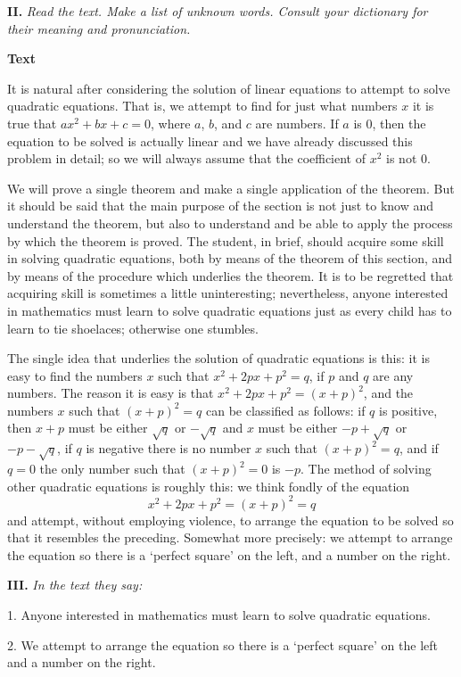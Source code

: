 \documentclass[a4paper]{article}
\newcommand{\ESect}[1]{\medskip\par{\large \textbf{#1}}\par}
\newcommand{\ETask}[2]{\medskip\par\textbf{#1.} \textit{#2}\par}
\begin{document}
\ETask{II}{Read the text. Make a list of unknown words. Consult your dictionary for their meaning and pronunciation.}

\ESect{Text}
It is natural after considering the solution of linear equations to attempt to solve quadratic equations. That is, we attempt to
find for just what numbers $x$ it is true that $ax^2+bx+c=0$, where $a$, $b$, and $c$ are numbers. If $a$ is 0, then the equation
to be solved is actually linear and we have already discussed this problem in detail; so we will always assume that the
coefficient of $x^2$ is not 0.

We will prove a single theorem and make a single application of the theorem. But it should be said that the main purpose of the
section is not just to know and understand the theorem, but also to understand and be able to apply the process by which the
theorem is proved. The student, in brief, should acquire some skill in solving quadratic equations, both by means of the theorem
of this section, and by means of the procedure which underlies the theorem. It is to be regretted that acquiring skill is
sometimes a little uninteresting; nevertheless, anyone interested in mathematics must learn to solve quadratic equations just
as every child has to learn to tie shoelaces; otherwise one stumbles.

The single idea that underlies the solution of quadratic equations is this: it is easy to find the numbers $x$ such that
$x^2+2px+p^2=q$, if $p$ and $q$ are any numbers. The reason it is easy is that $x^2+2px+p^2=(x+p)^2$, and the numbers $x$ such
that $(x+p)^2=q$ can be classified as follows: if $q$ is positive, then $x + p$ must be either $\sqrt{q}$ or $-\sqrt{q}$ and
$x$ must be either $-p+\sqrt{q}$ or $-p-\sqrt{q}$, if $q$ is negative there is no number $x$ such that $(x+p)^2=q$, and
if $q = 0$ the only number such that $(x+p)^2=0$ is $-p$. The method of solving other quadratic equations is roughly this:
we think fondly of the equation
$$x^2+2px+p^2=(x+p)^2=q$$
and attempt, without employing violence, to arrange the equation to be solved so that it resembles the preceding. Somewhat
more precisely: we attempt to arrange the equation so there is a `perfect square' on the left, and a number on the right.

\ETask{III}{In the text they say:}
1. Anyone interested in mathematics must learn to solve quadratic equations.

2. We attempt to arrange the equation so there is a `perfect square' on the left and a number on the right.
\end{document}
